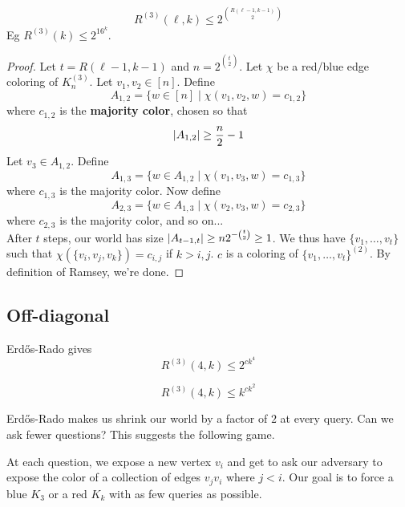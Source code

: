 \documentclass{article}
\begin{document}
\begin{thm}
  $$R^{(3)}(\ell, k) \le 2^{\binom{R(\ell - 1, k - 1)}2}$$
  Eg $R^{(3)}(k) \le 2^{16^k}$.
\end{thm}
\begin{proof}
  Let $t = R(\ell - 1, k - 1)$ and $n = 2^{\binom t2}$. Let $\chi$ be a red/blue edge coloring of $K_n^{(3)}$. Let $v_1, v_2 \in [n]$. Define
  $$A_{1, 2} = \{w \in [n] \mid \chi({v_1, v_2, w}) = c_{1, 2}\}$$
  where $c_{1, 2}$ is the {\bf majority color}, chosen so that
  $$\left\lvert A_{1, 2}\right\rvert \ge \frac n2 - 1$$
  Let $v_3 \in A_{1, 2}$. Define
  $$A_{1, 3} = \{w \in A_{1, 2} \mid \chi({v_1, v_3, w}) = c_{1, 3}\}$$
  where $c_{1, 3}$ is the majority color. Now define
  $$A_{2, 3} = \{w \in A_{1, 3} \mid \chi({v_2, v_3, w}) = c_{2, 3}\}$$
  where $c_{2, 3}$ is the majority color, and so on... \\
  After $t$ steps, our world has size $\left\lvert A_{t - 1, t}\right\rvert \ge n2^{-\binom t2} \ge 1$. We thus have $\{v_1, \dots, v_t\}$ such that $\chi(\{v_i, v_j, v_k\}) = c_{i, j}$ if $k > i, j$. $c$ is a coloring of $\{v_1, \dots, v_t\}^{(2)}$. By definition of Ramsey, we're done.
\end{proof}

\clearpage

\subsection{Off-diagonal}

\newlec

Erd\H os-Rado gives
$$R^{(3)}(4, k) \le 2^{ck^4}$$

\begin{thm}
  $$R^{(3)}(4, k) \le k^{ck^2}$$
\end{thm}

Erd\H os-Rado makes us shrink our world by a factor of $2$ at every query. Can we ask fewer questions? This suggests the following game.

\begin{dfn}
  At each question, we expose a new vertex $v_i$ and get to ask our adversary to expose the color of a collection of edges $v_j v_i$ where $j < i$. Our goal is to force a blue $K_3$ or a red $K_k$ with as few queries as possible.
\end{dfn}
\end{document}
